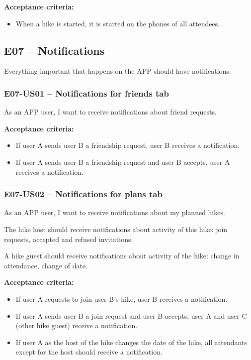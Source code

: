 \textbf{Acceptance criteria:}
\begin{itemize}
    \item When a hike is started, it is started on the phones of all attendees.
\end{itemize}

\subsection*{E07 -- Notifications}
Everything important that happens on the APP should have notifications.

\subsubsection*{E07-US01 -- Notifications for friends tab}
As an APP user, I want to receive notifications about friend requests.

\textbf{Acceptance criteria:}
\begin{itemize}
    \item If user A sends user B a friendship request, user B receives a notification.
    \item If user A sends user B a friendship request and user B accepts, user A receives a notification.
\end{itemize}

\subsubsection*{E07-US02 -- Notifications for plans tab}
As an APP user, I want to receive notifications about my planned hikes.

The hike host should receive notifications about activity of this hike: join requests, accepted and refused invitations.

A hike guest should receive notifications about activity of the hike: change in attendance, change of date.

\textbf{Acceptance criteria:}
\begin{itemize}
    \item If user A requests to join user B's hike, user B receives a notification.
    \item If user A sends user B a join request and user B accepts, user A and user C (other hike guest) receive a notification.
    \item If user A as the host of the hike changes the date of the hike, all attendants except for the host should receive a notification.
\end{itemize}

